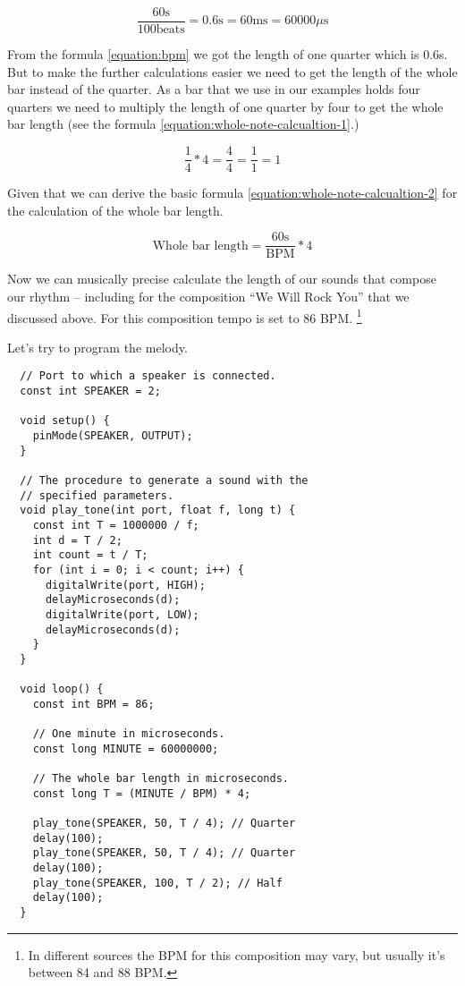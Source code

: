 \documentclass[../sparc.tex]{subfiles}
\begin{document}
\begin{equation}
  \frac{60 \mbox{s}}{100 \mbox{beats}} = 0.6 \mbox{s} = 60 \mbox{ms} = 60000 \mu\mbox{s}
  \label{equation:bpm}
\end{equation}

From the formula \ref{equation:bpm} we got the length of one quarter which is
0.6s.  But to make the further calculations easier we need to get the length of
the whole bar instead of the quarter.  As a bar that we use in our examples
holds four quarters we need to multiply the length of one quarter by four to get
the whole bar length (see the formula \ref{equation:whole-note-calcualtion-1}.)

\begin{equation}
  \frac{1}{4} * 4 = \frac{4}{4} = \frac{1}{1} = 1
  \label{equation:whole-note-calcualtion-1}
\end{equation}

Given that we can derive the basic formula
\ref{equation:whole-note-calcualtion-2} for the calculation of the whole bar
length.

\begin{equation}
  \mbox{Whole bar length} = \frac{60 \mbox{s}}{\mbox{BPM}} * 4
  \label{equation:whole-note-calcualtion-2}
\end{equation}

Now we can musically precise calculate the length of our sounds that compose our
rhythm -- including for the composition ``We Will Rock You'' that we discussed
above.  For this composition tempo is set to 86 BPM. \footnote{In different
sources the BPM for this composition may vary, but usually it's between 84 and
88 BPM.}

Let's try to program the melody.

\begin{verbatim}
  // Port to which a speaker is connected.
  const int SPEAKER = 2;

  void setup() {
    pinMode(SPEAKER, OUTPUT);
  }

  // The procedure to generate a sound with the
  // specified parameters.
  void play_tone(int port, float f, long t) {
    const int T = 1000000 / f;
    int d = T / 2;
    int count = t / T;
    for (int i = 0; i < count; i++) {
      digitalWrite(port, HIGH);
      delayMicroseconds(d);
      digitalWrite(port, LOW);
      delayMicroseconds(d);
    }
  }

  void loop() {
    const int BPM = 86;

    // One minute in microseconds.
    const long MINUTE = 60000000;

    // The whole bar length in microseconds.
    const long T = (MINUTE / BPM) * 4;

    play_tone(SPEAKER, 50, T / 4); // Quarter
    delay(100);
    play_tone(SPEAKER, 50, T / 4); // Quarter
    delay(100);
    play_tone(SPEAKER, 100, T / 2); // Half
    delay(100);
  }
\end{verbatim}
\end{document}
